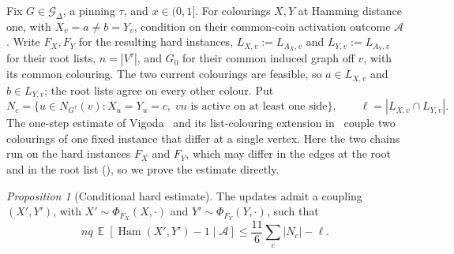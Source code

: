 \documentclass[11pt,reqno]{article}
\theoremstyle{plain}
\newtheorem{proposition}[theorem]{Proposition}
\theoremstyle{definition}
\theoremstyle{remark}
\newtheorem{proposition}[proposition]{Proposition}
\theoremstyle{definition}
\theoremstyle{remark}
\DeclareMathOperator{\E}{\mathbb{E}}
\DeclareMathOperator{\Ham}{Ham}
\newcommand{\Deg}{\Delta}                        %
\newcommand{\Gdeg}{\mathcal{G}_{\Deg}}
\newcommand{\flip}{\Phi}                           %
\begin{document}
Fix \(G\in\Gdeg\), a pinning \(\tau\), and \(x\in(0,1]\).
For colourings \(X,Y\) at Hamming distance one, with
\(X_v=a\ne b=Y_v\), condition on their common-coin activation outcome
\(\mathcal A\).  Write \(F_X,F_Y\) for the resulting hard instances,
\(L_{X,v}:=L_{A_X,v}\) and \(L_{Y,v}:=L_{A_Y,v}\) for their root lists,
\(n=|V^\tau|\), and \(G_0\) for their common induced graph off \(v\),
with its common colouring.  The two current colourings are feasible, so
\(a\in L_{X,v}\) and \(b\in L_{Y,v}\); the root lists agree on every
other colour.  Put
\[
  N_c=\{u\in N_{G^\tau}(v):X_u=Y_u=c,\;
    vu\text{ is active on at least one side}\},
  \qquad \ell=|L_{X,v}\cap L_{Y,v}|.
\]
The one-step estimate of Vigoda~\cite{Vigoda2000} and its list-colouring
extension in~\cite[Section~6 and Appendix~E]{CDMPP2019} couple two
colourings of one fixed instance that differ at a single vertex.  Here the
two chains run on the hard instances \(F_X\) and \(F_Y\), which may differ
in the edges at the root and in the root list
(), so we prove the estimate
directly.

\begin{proposition}[Conditional hard estimate]\label{prop:hard-one-step}
The updates admit a coupling \((X',Y')\), with
\(X'\sim\flip_{F_X}(X,\cdot)\) and \(Y'\sim\flip_{F_Y}(Y,\cdot)\), such
that
\begin{equation}\label{eq:conditional-hard-estimate}
  nq\,\E[\Ham(X',Y')-1\mid\mathcal A]
  \le\frac{11}{6}\sum_c|N_c|-\ell.
\end{equation}
\end{proposition}
\end{document}
